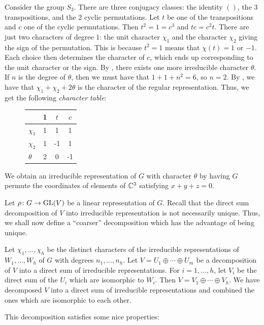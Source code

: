 \documentclass[letterpaper, 11pt, oneside]{book}
\begin{document}
\begin{ex}\label{ex:char_table_S3}
  Consider the group $S_{3}$.
  There are three conjugacy classes: the identity $()$, the 3 transpositions, and the 2 cyclic permutations.
  Let $t$ be one of the transpositions and $c$ one of the cyclic permutations.
  Then $t^{2} = 1 = c^{3}$ and $tc = c^{2}t$.
  There are just two characters of degree $1$: the unit character $\chi_{1}$ and the character $\chi_{2}$ giving the sign of the permutation.
  This is because $t^{2} = 1$ means that $\chi(t) = 1$ or $-1$.
  Each choice then determines the character of $c$, which ends up corresponding to the unit character or the sign.
  By , there exists one more irreducible character $\theta$.
  If $n$ is the degree of $\theta$, then we must have that $1 + 1 + n^{2} = 6$, so $n = 2$.
  By , we have that $\chi_{1} + \chi_{2} + 2\theta$ is the character of the regular representation.
  Thus, we get the following \emph{character table}:

  \begin{figure}[h]
    \centering
      \begin{tabular}{l|ccc}
        & 1 & $t$ & $c$ \\ \hline
        $\chi_1$ & 1 & 1   & 1   \\
        $\chi_2$ & 1 & -1  & 1   \\
        $\theta$ & 2 & 0   & -1
      \end{tabular}
  \end{figure}

  We obtain an irreducible representation of $G$ with character $\theta$ by having $G$ permute the coordinates of elements of $\mathbb{C}^{3}$ satisfying $x + y + z = 0$.
\end{ex}

Let $\rho\colon G \to \operatorname{GL}(V)$ be a linear representation of $G$.
Recall that the direct sum decomposition of $V$ into irreducible representation is not necessarily unique.
Thus, we shall now define a ``coarser'' decomposition which has the advantage of being unique.

\begin{defn}
  Let $\chi_{1}, \ldots, \chi_{h}$ be the distinct characters of the irreducible representations of $W_{1}, \ldots, W_{h}$ of $G$ with degrees $n_{1}, \ldots, n_{h}$.
  Let $V = U_{1} \oplus \cdots \oplus U_{m}$ be a decomposition of $V$ into a direct sum of irreducible representations.
  For $i = 1, \ldots, h$, let $V_{i}$ be the direct sum of the $U_{i}$ which are isomorphic to $W_{i}$.
  Then $V = V_{1} \oplus \cdots \oplus V_{h}$.
  We have decomposed $V$ into a direct sum of irreducible representations and combined the ones which are isomorphic to each other.
\end{defn}
This decomposition satisfies some nice properties:
\end{document}

